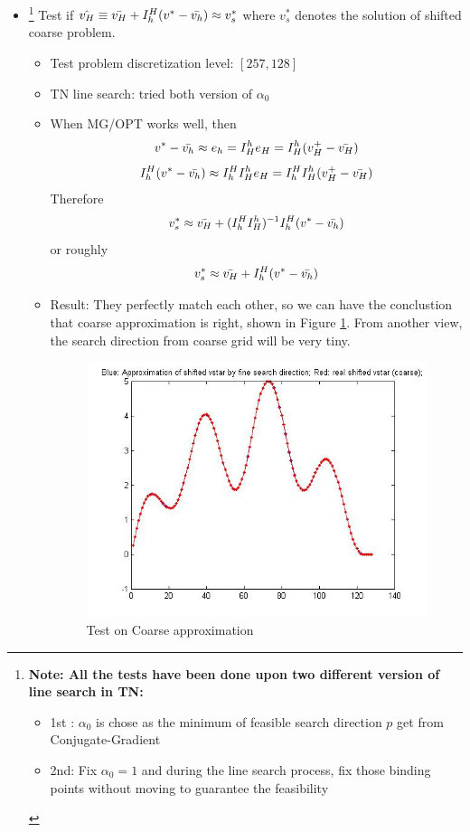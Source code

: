 \documentclass[10pt]{article}
\begin{document}
\begin{itemize}
\begin{itemize}
\begin{itemize}
\end{itemize}  
\end{itemize}
\item  \footnote{\bf Note: All the tests have been done upon two different version of line search in TN: 
\begin{itemize}
\item 1st : $\alpha_{0}$ is chose as the minimum of feasible search direction $p$ get from Conjugate-Gradient
\item 2nd: Fix $\alpha_{0}=1$ and during the line search process, fix those binding points without moving to guarantee the feasibility
\end{itemize}
} Test if $\hat{v_{H}} \equiv \bar{v_{H}}+I_h^H(v^{*}-\bar{v_{h}}) \approx v_{s}^{*}$ where $v_{s}^{*}$ denotes the solution of shifted coarse problem. 
\begin{itemize}
\item  Test problem discretization level: $ [257,128]$
\item TN line search:  tried both version of $\alpha_{0}$
\item When MG/OPT works well, then $$v^{*}-\bar{v_{h}}\approx e_{h}=I_H^h e_{H}=I_H^h(v_{H}^{+}-\bar{v_{H}})$$
$$I_h^H(v^{*}-\bar{v_{h}})\approx I_h^H I_H^h e_{H}=I_h^H I_H^h(v_{H}^{+}-\bar{v_{H}})$$ Therefore	
$$v_{s}^{*}\approx \bar{v_{H}}+(I_h^H I_H^h)^{-1}I_h^H(v^{*}-\bar{v_{h}})$$ or roughly
$$v_{s}^{*}\approx \bar{v_{H}}+I_h^H(v^{*}-\bar{v_{h}})$$
\item Result: They perfectly match each other, so we can have the conclustion that coarse approximation is right, shown in Figure \ref{fig:shift}. From another view, the search direction from coarse grid will be very tiny.
\begin{figure}[h]
\centering
  \includegraphics[width=1.0\textwidth]{shiftapprox.jpg}
  \caption{Test on Coarse approximation}
\label{fig:shift}
\end{figure}
\end{itemize}


\end{itemize}
\end{document}
